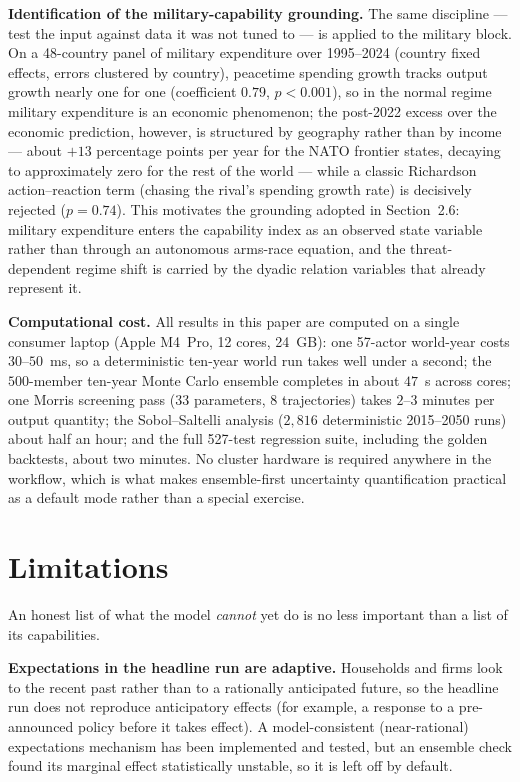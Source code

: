 \documentclass[a4paper,fleqn]{cas-sc}
\begin{document}
\textbf{Identification of the military-capability grounding.} The same discipline --- test the
input against data it was not tuned to --- is applied to the military block. On a 48-country panel
of military expenditure over 1995--2024 (country fixed effects, errors clustered by country),
peacetime spending growth tracks output growth nearly one for one (coefficient $0.79$, $p<0.001$),
so in the normal regime military expenditure is an economic phenomenon; the post-2022 excess over
the economic prediction, however, is structured by geography rather than by income --- about $+13$
percentage points per year for the NATO frontier states, decaying to approximately zero for the
rest of the world --- while a classic Richardson action--reaction term (chasing the rival's
spending growth rate) is decisively rejected ($p=0.74$). This motivates the grounding adopted in
Section~2.6: military expenditure enters the capability index as an observed state variable rather
than through an autonomous arms-race equation, and the threat-dependent regime shift is carried by
the dyadic relation variables that already represent it.

\textbf{Computational cost.} All results in this paper are computed on a single consumer laptop
(Apple M4~Pro, 12 cores, 24~GB): one 57-actor world-year costs $30$--$50$~ms, so a deterministic
ten-year world run takes well under a second; the $500$-member ten-year Monte Carlo ensemble
completes in about $47$~s across cores; one Morris screening pass (33 parameters, 8 trajectories)
takes $2$--$3$ minutes per output quantity; the Sobol--Saltelli analysis ($2{,}816$ deterministic
2015--2050 runs) about half an hour; and the full 527-test regression suite, including the golden
backtests, about two minutes. No cluster hardware is required anywhere in the workflow, which is
what makes ensemble-first uncertainty quantification practical as a default mode rather than a
special exercise.

\section{Limitations}
\label{sec:limits}


An honest list of what the model \emph{cannot} yet do is no less important than a list of its
capabilities.

\textbf{Expectations in the headline run are adaptive.} Households and firms look to the recent past
rather than to a rationally anticipated future, so the headline run does not reproduce anticipatory
effects (for example, a response to a pre-announced policy before it takes effect). A model-consistent
(near-rational) expectations mechanism has been implemented and tested, but an ensemble check found its
marginal effect statistically unstable, so it is left off by default.
\end{document}
